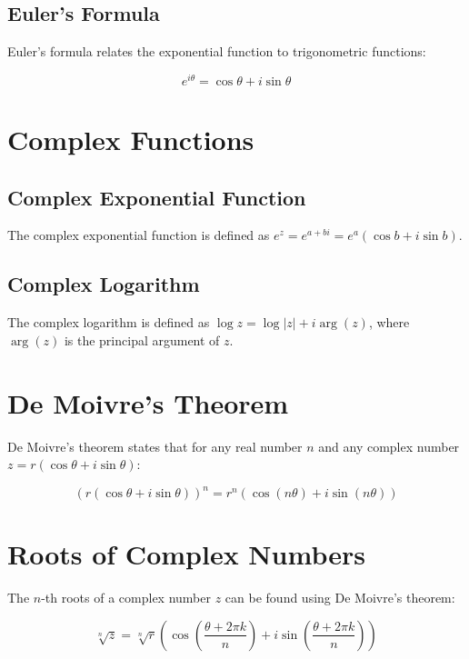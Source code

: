 \documentclass{article}
\begin{document}
\subsection{Euler's Formula}

Euler's formula relates the exponential function to trigonometric functions:

\begin{equation}
    e^{i\theta} = \cos \theta + i \sin \theta
\end{equation}

\section{Complex Functions}

\subsection{Complex Exponential Function}

The complex exponential function is defined as $e^z = e^{a+bi} = e^a(\cos b + i \sin b)$.

\subsection{Complex Logarithm}

The complex logarithm is defined as $\log z = \log|z| + i \arg(z)$, where $\arg(z)$ is the principal argument of $z$.

\section{De Moivre's Theorem}

De Moivre's theorem states that for any real number $n$ and any complex number $z = r(\cos \theta + i \sin \theta)$:

\begin{equation}
    (r(\cos \theta + i \sin \theta))^n = r^n (\cos (n\theta) + i \sin (n\theta))
\end{equation}

\section{Roots of Complex Numbers}

The $n$-th roots of a complex number $z$ can be found using De Moivre's theorem:

\begin{equation}
    \sqrt[n]{z} = \sqrt[n]{r} \left(\cos \left(\frac{\theta + 2\pi k}{n}\right) + i \sin \left(\frac{\theta + 2\pi k}{n}\right)\right)
\end{equation}
\end{document}
